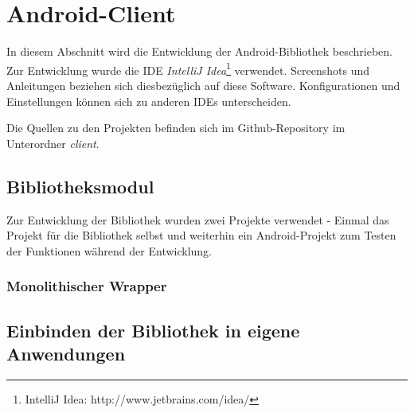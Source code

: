 \section{Android-Client}

In diesem Abschnitt wird die Entwicklung der Android-Bibliothek beschrieben. Zur Entwicklung wurde die IDE \textit{IntelliJ Idea}\footnote{IntelliJ Idea: http://www.jetbrains.com/idea/} verwendet. Screenshots und Anleitungen beziehen sich diesbezüglich auf diese Software. Konfigurationen und Einstellungen können sich zu anderen IDEs unterscheiden. 

Die Quellen zu den Projekten befinden sich im Github-Repository im Unterordner \textit{client}.

\subsection{Bibliotheksmodul}

Zur Entwicklung der Bibliothek wurden zwei Projekte verwendet - Einmal das Projekt für die Bibliothek selbst und weiterhin ein Android-Projekt zum Testen der Funktionen während der Entwicklung. 

\subsubsection{Monolithischer Wrapper}

\subsection{Einbinden der Bibliothek in eigene Anwendungen}


